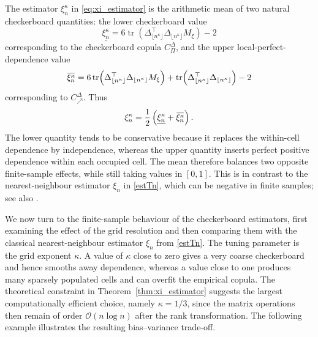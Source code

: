 \documentclass{article}
\theoremstyle{definition}
\newcommand{\OO}{\mathcal{O}}  %
\DeclareMathOperator{\tr}{tr}  %
\newcommand{\overbar}[1]{\mkern 1.5mu\overline{\mkern-1.5mu#1\mkern-1.5mu}\mkern 1.5mu}
\begin{document}
The estimator $\xi_n^\kappa$ in \eqref{eq:xi_estimator} is the arithmetic mean of two natural checkerboard quantities: the lower checkerboard value
\[
    \underline{\xi_n^\kappa}
    =
    6 \tr\!\left(
        \Delta_{\lfloor n^\kappa\rfloor}^{\top}
        \Delta_{\lfloor n^\kappa\rfloor}
        M_\xi
    \right)-2
\]
corresponding to the checkerboard copula $C_\Pi^\Delta$, and the upper local-perfect-dependence value
\[
    \overbar{\xi_n^\kappa}
    =
    6 \tr\!\left(
        \Delta_{\lfloor n^\kappa\rfloor}^{\top}
        \Delta_{\lfloor n^\kappa\rfloor}
        M_\xi
    \right)
    +
    \tr\!\left(
        \Delta_{\lfloor n^\kappa\rfloor}^{\top}
        \Delta_{\lfloor n^\kappa\rfloor}
    \right)
    -2
\]
corresponding to $C_\nearrow^\Delta$.
Thus
\[
    \xi_n^\kappa
    =
    \frac12
    \left(
        \underline{\xi_n^\kappa}
        +
        \overbar{\xi_n^\kappa}
    \right).
\]
The lower quantity tends to be conservative because it replaces the within-cell dependence by independence, whereas the upper quantity inserts perfect positive dependence within each occupied cell.
The mean therefore balances two opposite finite-sample effects, while still taking values in $[0,1]$.
This is in contrast to the nearest-neighbour estimator $\xi_n$ in \eqref{estTn}, which can be negative in finite samples; see also \cite[Remark~3]{chatterjee2021}.

We now turn to the finite-sample behaviour of the checkerboard estimators, first examining the effect of the grid resolution and then comparing them with the classical nearest-neighbour estimator $\xi_n$ from \eqref{estTn}.
The tuning parameter is the grid exponent $\kappa$.
A value of $\kappa$ close to zero gives a very coarse checkerboard and hence smooths away dependence, whereas a value close to one produces many sparsely populated cells and can overfit the empirical copula.
The theoretical constraint in Theorem~\ref{thm:xi_estimator} suggests the largest computationally efficient choice, namely $\kappa=1/3$, since the matrix operations then remain of order $\OO(n\log n)$ after the rank transformation.
The following example illustrates the resulting bias--variance trade-off.
\end{document}
